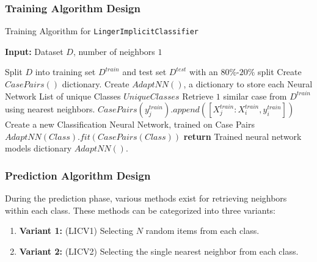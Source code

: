 \documentclass[a4paper, 12pt]{report}
\begin{document}
\subsubsection{Training Algorithm Design}
\begin{algorithm}[H]
    \caption{Training Algorithm for \texttt{LingerImplicitClassifier}}
    \label{alg:LingerImplicitClassifier_train}

    \textbf{Input:} Dataset $D$, number of neighbors $1$
    \begin{algorithmic}
        \State Split $D$ into training set $D^{train}$ and test set $D^{test}$ with an $80\%$-$20\%$ split
        \State Create $CasePairs()$ dictionary.
        \State Create $AdaptNN()$, a dictionary to store each Neural Network
        \State List of unique Classes $UniqueClasses$
            \State Retrieve $1$ similar case from $D^{train}$ using nearest neighbors.
                \State $CasePairs(y^{train}_j).append([X^{train}_j:X^{train}_i, y^{train}_i])$
            \EndFor
        \EndFor
            \State Create a new Classification Neural Network, trained on Case Pairs
            \State $AdaptNN(Class).fit(CasePairs(Class))$
        \EndFor
        \State \textbf{return} Trained neural network models dictionary $AdaptNN()$.
    \end{algorithmic}
\end{algorithm}

\subsubsection{Prediction Algorithm Design} 
\label{sec:lingerImplicit_classification_baseV1V2_model}

During the prediction phase, various methods exist for retrieving neighbors within each class. These methods can be categorized into three variants:

\begin{enumerate}
\item \textbf{Variant 1:} (LICV1) Selecting $N$ random items from each class.
\item \textbf{Variant 2:} (LICV2) Selecting the single nearest neighbor from each class.
\end{enumerate}
\end{document}
